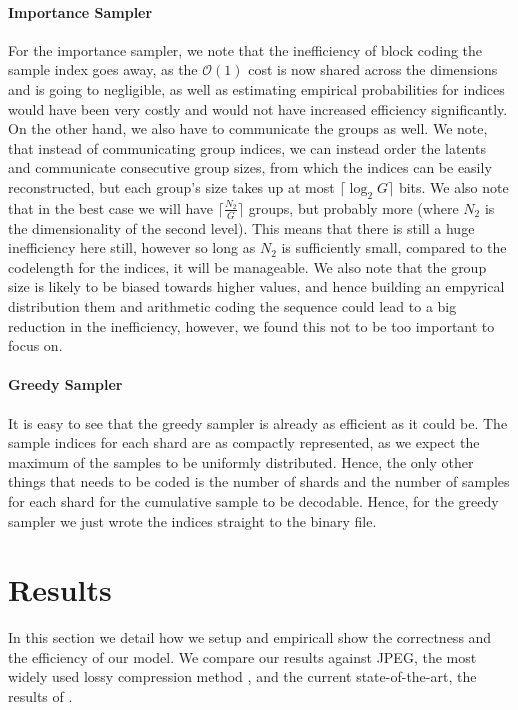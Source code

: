 \documentclass{article}
\newcommand{\Oh}{\mathcal{O}}
\begin{document}
\paragraph{Importance Sampler}  For the importance sampler, we note that the
inefficiency of block coding the sample index goes away, as the $\Oh(1)$ cost is
now shared across the dimensions and is going to negligible, as well as
estimating empirical probabilities for indices would have been very costly and
would not have increased efficiency significantly. On the other hand, we also
have to communicate the groups as well. We note, that instead of communicating
group indices, we can instead order the latents and communicate consecutive
group sizes, from which the indices can be easily reconstructed, but each
group's size takes up at most $\lceil \log_2G \rceil$ bits. We also note that in
the best case we will have $\lceil \frac{N_2}{G} \rceil$ groups, but probably
more (where $N_2$ is the dimensionality of the second level). This means that
there is still a huge inefficiency here still, however so long as $N_2$ is
sufficiently small, compared to the codelength for the indices, it will be
manageable. We also note that the group size is likely to be biased towards
higher values, and hence building an empyrical distribution them and arithmetic
coding the sequence could lead to a big reduction in the inefficiency, however,
we found this not to be too important to focus on. 
\paragraph{Greedy Sampler} It is easy to see that the greedy sampler is already
as efficient as it could be. The sample indices for each shard are as compactly
represented, as we expect the maximum of the samples to be uniformly
distributed. Hence, the only other things that needs to be coded is the number
of shards and the number of samples for each shard for the cumulative sample to
be decodable. Hence, for the greedy sampler we just wrote the indices straight
to the binary file.

\section{Results}
\label{sec:experimental_results}
\par
In this section we detail how we setup and empiricall show the correctness and
the efficiency of our model. We compare our results against JPEG, the most
widely used lossy compression method \cite{bull2014communicating}, and the
current state-of-the-art, the results of \cite{balle2018variational}\footnotemark.
\cite{zhao2015loss}
\end{document}
